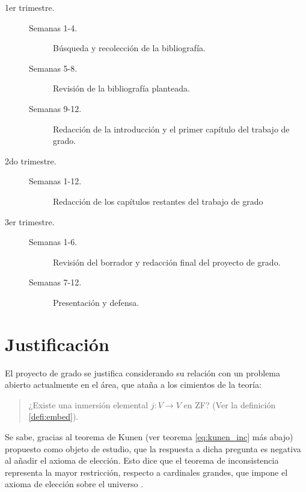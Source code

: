 \documentclass[12pt]{article}
\begin{document}
    \begin{description}
        \let\olditem\item
        \renewcommand\item[1][]{\olditem[\normalfont #1.]}
        \item[1er trimestre]
            \begin{minipage}[t]{\dimexpr\linewidth-2cm\relax}
                \begin{description}
                    \item[Semanas 1-4] Búsqueda y recolección de la bibliografía.
                    \item[Semanas 5-8] Revisión de la bibliografía planteada.
                    \item[Semanas 9-12] Redacción de la introducción y el primer capítulo
                                        del trabajo de grado.
                \end{description}
            \end{minipage}
        \item[2do trimestre]
            \begin{minipage}[t]{\linewidth}
                \begin{description}
                    \item[Semanas 1-12] Redacción de los capítulos restantes del trabajo de grado
                \end{description}
            \end{minipage}
        \item[3er trimestre]
            \begin{minipage}[t]{\linewidth}
                \begin{description}
                    \item[Semanas 1-6] Revisión del borrador y redacción final del
                                       proyecto de grado.
                    \item[Semanas 7-12] Presentación y defensa.
                \end{description}
            \end{minipage}
    \end{description}

    \section{Justificación}
    El proyecto de grado se justifica considerando
    su relación con un problema abierto actualmente en el área,
    que ataña a los cimientos de la teoría:
    \begin{quote}
        ¿Existe una inmersión elemental $j\colon V\to V$ en ZF? (Ver la definición \ref{defi:embed}).
    \end{quote}
    Se sabe, gracias al teorema de Kunen (ver teorema \ref{eq:kunen_inc} más abajo) propuesto como objeto de estudio,
    que la respuesta a dicha pregunta es negativa al añadir el axioma de elección. Esto dice
    que el teorema de inconsistencia representa la mayor restricción, respecto a cardinales grandes,
    que impone el axioma de elección sobre el universo \cite[Pág 324]{kanamori_higher_2009}.
\end{document}
